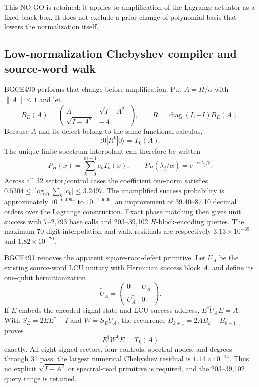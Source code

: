 \documentclass[11pt]{article}
\theoremstyle{definition}
\theoremstyle{remark}
\begin{document}
This NO-GO is retained: it applies to amplification of the Lagrange actuator as a fixed black box. It does not exclude a prior change of polynomial basis that lowers the normalization itself.

\subsection{Low-normalization Chebyshev compiler and source-word walk}

BGCE490 performs that change before amplification. Put $A=H/\alpha$ with $\lVert A\rVert\le1$ and let
\begin{equation}
 B_E(A)=
 \begin{pmatrix}
  A & \sqrt{I-A^2}\\
  \sqrt{I-A^2} & -A
 \end{pmatrix},\qquad
 R=\operatorname{diag}(I,-I)B_E(A).
\end{equation}
Because $A$ and its defect belong to the same functional calculus,
\begin{equation}
 \langle0|R^k|0\rangle=T_k(A).
 \label{eq:chebwalk091}
\end{equation}
The unique finite-spectrum interpolant can therefore be written
\begin{equation}
 P_H(x)=\sum_{k=0}^{m-1}c_kT_k(x),\qquad
 P_H(\lambda_j/\alpha)=e^{-i\pi\lambda_j/3}.
\end{equation}
Across all 32 sector/control cases the coefficient one-norm satisfies
$0.5304\le\log_{10}\sum_k|c_k|\le3.2497$. The unamplified success probability is approximately $10^{-6.4994}$ to $10^{-1.0609}$, an improvement of 39.40--87.10 decimal orders over the Lagrange construction. Exact phase matching then gives unit success with 7--2,793 base calls and 203--39,102 $H$-block-encoding queries. The maximum 70-digit interpolation and walk residuals are respectively $3.13\times10^{-69}$ and $1.82\times10^{-70}$.

BGCE491 removes the apparent square-root-defect primitive. Let $U_A$ be the existing source-word LCU unitary with Hermitian success block $A$, and define its one-qubit hermitianization
\begin{equation}
 \widetilde U_A=
 \begin{pmatrix}
 0&U_A\\ U_A^\dagger&0
 \end{pmatrix}.
\end{equation}
If $E$ embeds the encoded signal state and LCU success address, $E^\dagger\widetilde U_AE=A$. With $S_E=2EE^\dagger-I$ and $W=S_E\widetilde U_A$, the recurrence $B_{k+1}=2AB_k-B_{k-1}$ proves
\begin{equation}
 E^\dagger W^kE=T_k(A)
 \label{eq:sourcewordcheb091}
\end{equation}
exactly. All eight signed sectors, four controls, spectral nodes, and degrees through 31 pass; the largest numerical Chebyshev residual is $1.14\times10^{-14}$. Thus no explicit $\sqrt{I-A^2}$ or spectral-read primitive is required, and the 203--39,102 query range is retained.
\end{document}
